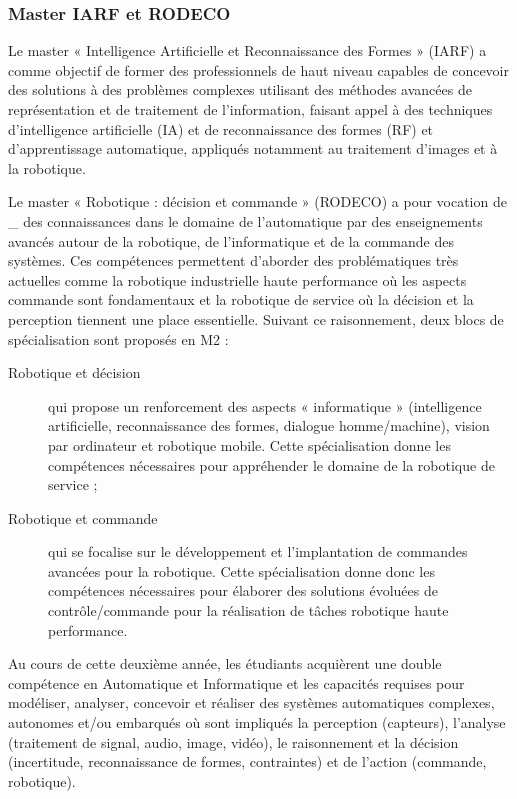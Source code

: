 \documentclass[10pt,a4paper]{article}
\begin{document}
\subsubsection{Master IARF et RODECO}

Le master « Intelligence Artificielle et Reconnaissance des Formes » (IARF) a comme objectif de former des professionnels de haut niveau capables de concevoir des solutions à des problèmes complexes utilisant des méthodes avancées de représentation et de traitement de l’information, faisant appel à des techniques d’intelligence artificielle (IA) et de reconnaissance des formes (RF) et d’apprentissage automatique, appliqués notamment au traitement d’images et à la robotique. 

Le master « Robotique : décision et commande » (RODECO) a pour vocation de \_ des connaissances dans le domaine de l’automatique par des enseignements avancés autour de la robotique, de l’informatique et de la commande des systèmes. Ces compétences permettent d’aborder des problématiques très actuelles comme la robotique industrielle haute performance où les aspects commande sont fondamentaux et la robotique  de service où la décision et la perception tiennent une place essentielle. Suivant ce raisonnement, deux blocs de spécialisation sont proposés en M2 : 

\begin{description}
\item [Robotique et décision] qui propose un renforcement des aspects « informatique » (intelligence artificielle, reconnaissance des formes, dialogue homme/machine), vision par ordinateur et robotique  mobile. Cette spécialisation donne les compétences nécessaires pour appréhender le domaine de la robotique de service ;
\item [Robotique et commande] qui se focalise sur le développement et l’implantation de commandes avancées pour la robotique. Cette spécialisation donne donc les compétences nécessaires pour élaborer des solutions évoluées de contrôle/commande pour la réalisation de tâches robotique haute performance.
\end{description}

Au cours de cette deuxième année, les étudiants acquièrent une double compétence en Automatique et Informatique et les capacités requises pour modéliser, analyser, concevoir et réaliser des systèmes automatiques complexes, autonomes et/ou embarqués où sont impliqués la perception (capteurs), l’analyse (traitement de signal, audio, image, vidéo), le raisonnement et la décision (incertitude, reconnaissance de formes, contraintes) et de l’action (commande, robotique).
  
\end{document}
